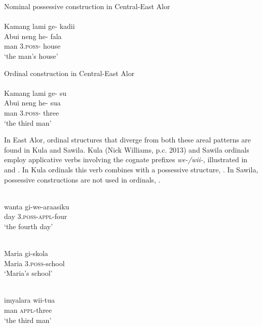 \ea%
\label{bkm:Ref342649962}
   Nominal possessive construction in Central-East Alor \\
\langinfo{}{}{}\\
\glll  Kamang  lami  ge-  kadii \\  
     Abui     neng  he-  fala  \\
     {}      man  3\textsc{.poss- } house\\
 \glt `the man's house'
\z

\ea%
\label{bkm:Ref342309284}
    Ordinal construction in Central-East Alor\\
\langinfo{}{}{}\\
\glll Kamang   lami  ge- su \\  
    Abui     neng  he-  sua   \\
    { }  man  3\textsc{.poss-}  three\\
\glt  `the third man'
\z 


In East Alor, ordinal structures that diverge from both these areal patterns are found in Kula and Sawila. Kula (Nick Williams, p.c. 2013) and Sawila ordinals employ applicative verbs involving the cognate prefixes \textit{we-/wii-}, illustrated in  and . In Kula ordinals this verb combines with a possessive structure, . In Sawila, possessive constructions  are not used in ordinals, . 


\ea%
\label{bkm:Ref355275027}
 
\\
\gll wanta   gi-we-araasiku\\  
  day   3.\textsc{poss}{}-\textsc{appl}{}-four  \\
\glt  `the fourth day'
\z
 

\ea%
\label{bkm:Ref358037937}
\\
\gll Maria   gi-skola\\  
   Maria   3.\textsc{poss-}school \\
\glt`Maria's school'
\z
 
  

  


\ea%
\label{bkm:Ref355277550}
\\
\gll   imyalara   wii-tua\\  
   man    \textsc{appl-}three \\
\glt  `the third man'
\z

